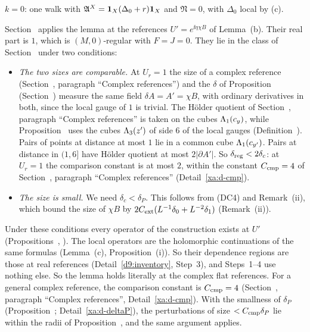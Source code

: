\begin{detail}
\begin{step}
$k=0$: one walk with $\mathfrak A^X=\mathbf 1_X(\Delta_0+r)\mathbf 1_X$ and $\mathfrak N=0$, with $\Delta_0$ local by (c).
\end{step}
\begin{step}
Section~ applies the lemma at the references $U'=e^{\ii\eta\chi B}$ of Lemma~(b). Their real part is $1$, which is $(M,0)$-regular with $F=J=0$. They lie in the class of Section~ under two conditions:
\begin{itemize}
\item \emph{The two sizes are comparable.} At $U_r=1$ the size of a complex reference (Section~, paragraph ``Complex references'') and the $\delta$ of Proposition~ (Section~) measure the same field $\delta\!A=A'=\chi B$, with ordinary derivatives in both, since the local gauge of $1$ is trivial. The H\"older quotient of Section~, paragraph ``Complex references'' is taken on the cubes $\Lambda_1(c_y)$, while Proposition~ uses the cubes $\Lambda_3(z')$ of side $6$ of the local gauges (Definition~). Pairs of points at distance at most $1$ lie in a common cube $\Lambda_1(c_{y'})$. Pairs at distance in $(1,6]$ have H\"older quotient at most $2|\partial A'|$. So $\delta_{\rm reg}<2\delta_c$: at $U_r=1$ the comparison constant is at most $2$, within the constant $C_{\rm cmp}=4$ of Section~, paragraph ``Complex references'' (Detail~\ref{xa:d-cmp}).
\item \emph{The size is small.} We need $\delta_c<\delta_P$. This follows from (DC4) and Remark~(ii), which bound the size of $\chi B$ by $2C_{\rm ext}(L^{-1}\delta_0+L^{-2}\delta_1)$ (Remark~(ii)).
\end{itemize}
Under these conditions every operator of the construction exists at $U'$ (Propositions~, ). The local operators are the holomorphic continuations of the same formulas (Lemma~(c), Proposition~(i)). So their dependence regions are those at real references (Detail~\ref{d9:inventory}, Step~3), and Steps~1--4 use nothing else. So the lemma holds literally at the complex flat references. For a general complex reference, the comparison constant is $C_{\rm cmp}=4$ (Section~, paragraph ``Complex references'', Detail~\ref{xa:d-cmp}). With the smallness of $\delta_P$ (Proposition~; Detail~\ref{xa:d-deltaP}), the perturbations of size $<C_{\rm cmp}\delta_P$ lie within the radii of Proposition~, and the same argument applies.
\end{step}
\end{detail}

